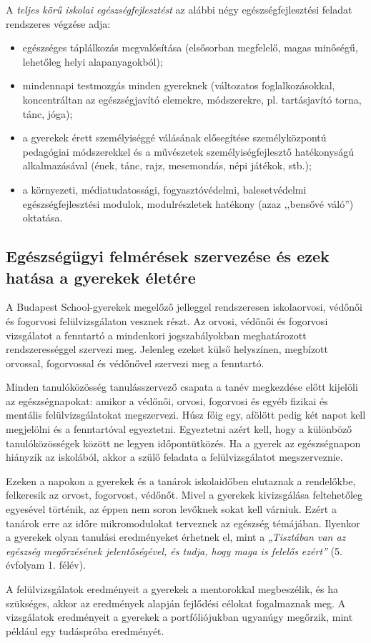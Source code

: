 A \emph{teljes körű iskolai egészségfejlesztést} az alábbi négy
egészségfejlesztési feladat rendszeres végzése adja:

\begin{itemize}
\item
  egészséges táplálkozás megvalósítása (elsősorban megfelelő, magas
  minőségű, lehetőleg helyi alapanyagokból);
\item
  mindennapi testmozgás minden gyereknek (változatos foglalkozásokkal,
  koncentráltan az egészségjavító elemekre, módszerekre, pl. tartásjavító
  torna, tánc, jóga);
\item
  a gyerekek érett személyiséggé válásának elősegítése személyközpontú
  pedagógiai módszerekkel és a művészetek személyiségfejlesztő
  hatékonyságú alkalmazásával (ének, tánc, rajz, mesemondás, népi
  játékok, stb.);
\item
  a környezeti, médiatudatossági, fogyasztóvédelmi, balesetvédelmi\break
  egészségfejlesztési modulok, modulrészletek hatékony (azaz
  ,,bensővé váló'') oktatása.
\end{itemize}

\hypertarget{egeszsegugyi-felmeres-szervezese-es-hatasa-a-gyerekek-eletere}{%
\subsection{Egészségügyi felmérések szervezése és ezek hatása a gyerekek
életére}\label{egeszsegugyi-felmeres-szervezese-es-hatasa-a-gyerekek-eletere}}

A Budapest School-gyerekek megelőző jelleggel rendszeresen iskolaorvosi,
védőnői és fogorvosi felülvizsgálaton vesznek részt. Az orvosi, védőnői
és fogorvosi vizsgálatot a fenntartó a mindenkori jogszabályokban
meghatározott rendszerességgel szervezi meg. Jelenleg ezeket külső
helyszínen, megbízott orvossal, fogorvossal és védőnővel szervezi meg a
fenntartó.

Minden tanulóközösség tanulásszervező csapata a tanév megkezdése előtt
kijelöli az egészségnapokat: amikor a védőnői, orvosi, fogorvosi és
egyéb fizikai és mentális felülvizsgálatokat megszervezi. Húsz főig egy,
afölött pedig két napot kell megjelölni és a fenntartóval egyeztetni.
Egyeztetni azért kell, hogy a különböző tanulóközösségek között ne
legyen időpontütközés. Ha a gyerek az egészségnapon hiányzik az
iskolából, akkor a szülő feladata a felülvizsgálatot megszerveznie.

Ezeken a napokon a gyerekek és a tanárok iskolaidőben elutaznak a
rendelőkbe, felkeresik az orvost, fogorvost, védőnőt. Mivel a gyerekek
kivizsgálása feltehetőleg egyesével történik, az éppen nem soron levőknek
sokat kell várniuk. Ezért a tanárok erre az időre
mikromodulokat terveznek az egészség témájában.  Ilyenkor a gyerekek olyan tanulási eredményeket
érhetnek el, mint a \emph{„Tisztában van az egészség megőrzésének
jelentőségével, és tudja, hogy maga is felelős ezért''} (5. évfolyam 1.
félév).

A felülvizsgálatok eredményeit a gyerekek a mentorokkal megbeszélik,
és ha szükséges, akkor az eredmények alapján fejlődési célokat
fogalmaznak meg. A vizsgálatok eredményeit a gyerekek a portfóliójukban
ugyanúgy megőrzik, mint például egy tudáspróba eredményét.
